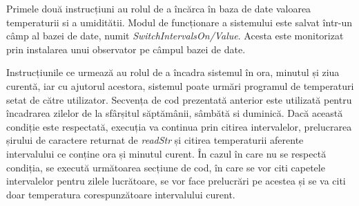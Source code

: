 	Primele două instrucțiuni au rolul de a încărca în baza de date valoarea temperaturii si a umiditătii. Modul de funcționare a sistemului este salvat într-un câmp al bazei de date, numit \textit{SwitchIntervalsOn/Value}. Acesta este monitorizat prin instalarea unui observator pe câmpul bazei de date. 

	Instrucțiunile ce urmează au rolul de a încadra sistemul în ora, minutul și ziua curentă, iar cu ajutorul acestora, sistemul poate urmări programul de temperaturi setat de către utilizator. Secvența de cod prezentată anterior este utilizată pentru încadrarea zilelor de la sfârșitul săptămânii, sâmbătă si duminică. Dacă această condiție este respectată, execuția va continua prin citirea intervalelor, prelucrarea șirului de caractere returnat de \textit{readStr} și citirea temperaturii aferente intervalului ce conține ora și minutul curent. În cazul în care nu se respectă condiția, se execută următoarea secțiune de cod, în care se vor citi capetele intervalelor pentru zilele lucrătoare, se vor face prelucrări pe acestea și se va citi doar temperatura corespunzătoare intervalului curent.   


\vspace{1em}
	
